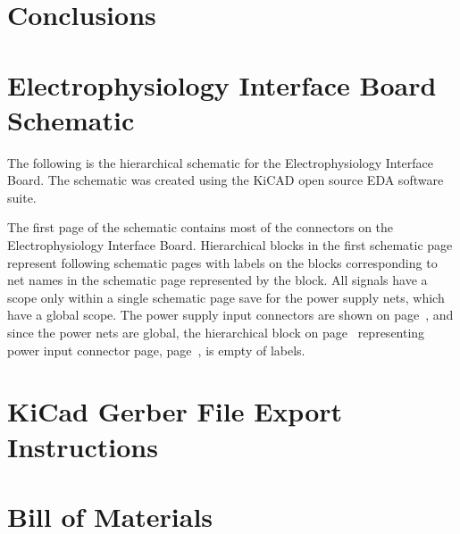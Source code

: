\documentclass{article}
\begin{document}
\section{Conclusions}



\newpage
\appendix
\appendixpage
\addappheadtotoc

\section{Electrophysiology Interface Board Schematic}\label{sec:schematic}

The following is the hierarchical schematic for the Electrophysiology Interface Board.  The schematic was created using the KiCAD open source EDA software suite.

The first page of the schematic contains most of the connectors on the Electrophysiology Interface Board.  Hierarchical blocks in the first schematic page represent following schematic pages with labels on the blocks corresponding to net names in the schematic page represented by the block.  All signals have a scope only within a single schematic page save for the power supply nets, which have a global scope.  The power supply input connectors are shown on page~\pageref{SchematicRev1r0.14}, and since the power nets are global, the hierarchical block on page~\pageref{SchematicRev1r0.1} representing power input connector page, page~\pageref{SchematicRev1r0.14}, is empty of labels.



\section{KiCad Gerber File Export Instructions}\label{sec:gerberexp}



\section{Bill of Materials}\label{sec:bom}
\end{document}
